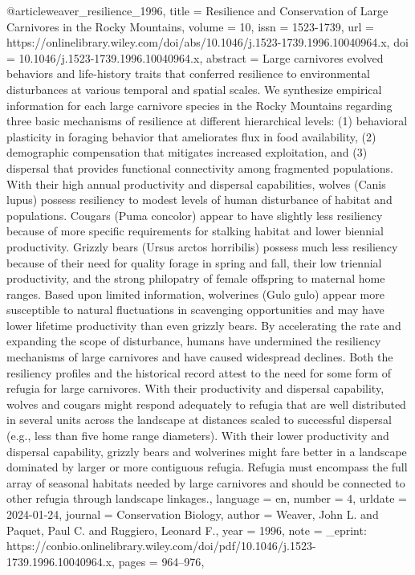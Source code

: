 {{{@article{weaver_resilience_1996,
	title = {Resilience and {Conservation} of {Large} {Carnivores} in the {Rocky} {Mountains}},
	volume = {10},
	issn = {1523-1739},
	url = {https://onlinelibrary.wiley.com/doi/abs/10.1046/j.1523-1739.1996.10040964.x},
	doi = {10.1046/j.1523-1739.1996.10040964.x},
	abstract = {Large carnivores evolved behaviors and life-history traits that conferred resilience to environmental disturbances at various temporal and spatial scales. We synthesize empirical information for each large carnivore species in the Rocky Mountains regarding three basic mechanisms of resilience at different hierarchical levels: (1) behavioral plasticity in foraging behavior that ameliorates flux in food availability, (2) demographic compensation that mitigates increased exploitation, and (3) dispersal that provides functional connectivity among fragmented populations. With their high annual productivity and dispersal capabilities, wolves (Canis lupus) possess resiliency to modest levels of human disturbance of habitat and populations. Cougars (Puma concolor) appear to have slightly less resiliency because of more specific requirements for stalking habitat and lower biennial productivity. Grizzly bears (Ursus arctos horribilis) possess much less resiliency because of their need for quality forage in spring and fall, their low triennial productivity, and the strong philopatry of female offspring to maternal home ranges. Based upon limited information, wolverines (Gulo gulo) appear more susceptible to natural fluctuations in scavenging opportunities and may have lower lifetime productivity than even grizzly bears. By accelerating the rate and expanding the scope of disturbance, humans have undermined the resiliency mechanisms of large carnivores and have caused widespread declines. Both the resiliency profiles and the historical record attest to the need for some form of refugia for large carnivores. With their productivity and dispersal capability, wolves and cougars might respond adequately to refugia that are well distributed in several units across the landscape at distances scaled to successful dispersal (e.g., less than five home range diameters). With their lower productivity and dispersal capability, grizzly bears and wolverines might fare better in a landscape dominated by larger or more contiguous refugia. Refugia must encompass the full array of seasonal habitats needed by large carnivores and should be connected to other refugia through landscape linkages.},
	language = {en},
	number = {4},
	urldate = {2024-01-24},
	journal = {Conservation Biology},
	author = {Weaver, John L. and Paquet, Paul C. and Ruggiero, Leonard F.},
	year = {1996},
	note = {\_eprint: https://conbio.onlinelibrary.wiley.com/doi/pdf/10.1046/j.1523-1739.1996.10040964.x},
	pages = {964--976},
}

}}}
